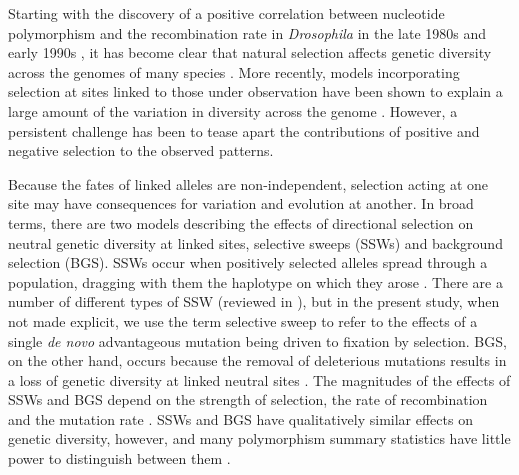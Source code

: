 	Starting with the discovery of a positive correlation between nucleotide polymorphism and the recombination rate in \textit{Drosophila} in the late 1980s and early 1990s \citep{RN225, RN114}, it has become clear that natural selection affects genetic diversity across the genomes of many species \citep{RN117, RN154}. More recently, models incorporating selection at sites linked to those under observation have been shown to explain a large amount of the variation in diversity across the genome \citep{RN120, RN228, RN116, RN274}. However, a persistent challenge has been to tease apart the contributions of positive and negative selection to the observed patterns.

	Because the fates of linked alleles are non-independent, selection acting at one site may have consequences for variation and evolution at another. In broad terms, there are two models describing the effects of directional selection on neutral genetic diversity at linked sites, selective sweeps (SSWs) and background selection (BGS). SSWs occur when positively selected alleles spread through a population, dragging with them the haplotype on which they arose \citep{RN124,RN235}. There are a number of different types of SSW (reviewed in \citealt{RN352}), but in the present study, when not made explicit, we use the term selective sweep to refer to the effects of a single \textit{de novo} advantageous mutation being driven to fixation by selection. BGS, on the other hand, occurs because the removal of deleterious mutations results in a loss of genetic diversity at linked neutral sites \citep{RN132, RN115}. The magnitudes of the effects of SSWs and BGS depend on the strength of selection, the rate of recombination and the mutation rate \citep{RN206, RN157, RN235}. SSWs and BGS have qualitatively similar effects on genetic diversity, however, and many polymorphism summary statistics have little power to distinguish between them \citep{RN339, RN115}. 

